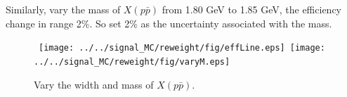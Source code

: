 Similarly, vary the mass of $X(p\bar{p})$ from 1.80 GeV to 1.85 GeV,
the efficiency change in range 2\%. So set 2\% as the uncertainty
associated with the mass.

\begin{figure}[htbp]
    \begin{center}
    \mbox{
        \texttt{[image: ../../signal\_MC/reweight/fig/effLine.eps]}
        \texttt{[image: ../../signal\_MC/reweight/fig/varyM.eps]}
    }
    \end{center}
    \caption{Vary the width and mass of $X(p\bar{p})$.}
    \label{fig: vary Mass and width}
\end{figure}

